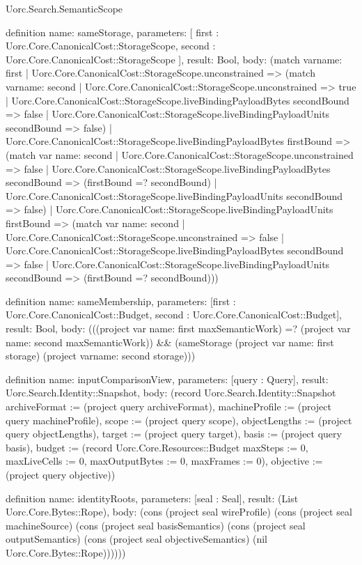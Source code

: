 \begin{lexlean}{Uorc.Search.SemanticScope}
\begin{semanticmodule}
definition{
  name: sameStorage,
  parameters: [
    first : Uorc.Core.CanonicalCost::StorageScope,
    second : Uorc.Core.CanonicalCost::StorageScope
  ],
  result: Bool,
  body: (match var{name: first}
    | Uorc.Core.CanonicalCost::StorageScope.unconstrained => (match var{name: second}
      | Uorc.Core.CanonicalCost::StorageScope.unconstrained => true
      | Uorc.Core.CanonicalCost::StorageScope.liveBindingPayloadBytes secondBound => false
      | Uorc.Core.CanonicalCost::StorageScope.liveBindingPayloadUnits secondBound => false)
    | Uorc.Core.CanonicalCost::StorageScope.liveBindingPayloadBytes firstBound => (match var{
        name: second
      }
      | Uorc.Core.CanonicalCost::StorageScope.unconstrained => false
      | Uorc.Core.CanonicalCost::StorageScope.liveBindingPayloadBytes secondBound => (firstBound =? secondBound)
      | Uorc.Core.CanonicalCost::StorageScope.liveBindingPayloadUnits secondBound => false)
    | Uorc.Core.CanonicalCost::StorageScope.liveBindingPayloadUnits firstBound => (match var{
        name: second
      }
      | Uorc.Core.CanonicalCost::StorageScope.unconstrained => false
      | Uorc.Core.CanonicalCost::StorageScope.liveBindingPayloadBytes secondBound => false
      | Uorc.Core.CanonicalCost::StorageScope.liveBindingPayloadUnits secondBound => (firstBound =? secondBound)))
}

definition{
  name: sameMembership,
  parameters: [first : Uorc.Core.CanonicalCost::Budget, second : Uorc.Core.CanonicalCost::Budget],
  result: Bool,
  body: (((project var{
    name: first
  } maxSemanticWork) =? (project var{
    name: second
  } maxSemanticWork)) && (sameStorage (project var{
    name: first
  } storage) (project var{name: second} storage)))
}

definition{
  name: inputComparisonView,
  parameters: [query : Query],
  result: Uorc.Search.Identity::Snapshot,
  body: (record Uorc.Search.Identity::Snapshot {archiveFormat := (project query archiveFormat), machineProfile := (project query machineProfile), scope := (project query scope), objectLengths := (project query objectLengths), target := (project query target), basis := (project query basis), budget := (record Uorc.Core.Resources::Budget {maxSteps := 0, maxLiveCells := 0, maxOutputBytes := 0, maxFrames := 0}), objective := (project query objective)})
}

definition{
  name: identityRoots,
  parameters: [seal : Seal],
  result: (List Uorc.Core.Bytes::Rope),
  body: (cons (project seal wireProfile) (cons (project seal machineSource) (cons (project seal basisSemantics) (cons (project seal outputSemantics) (cons (project seal objectiveSemantics) (nil Uorc.Core.Bytes::Rope))))))
}


\end{semanticmodule}
\end{lexlean}
